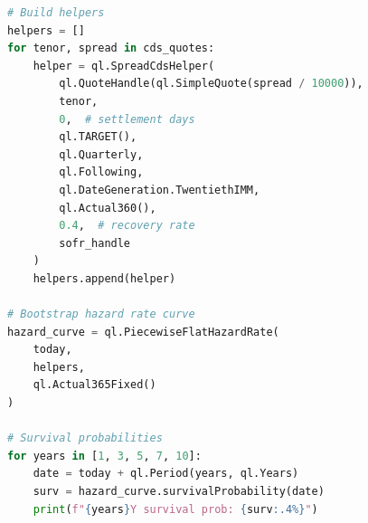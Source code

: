 \documentclass[11pt,a4paper]{article}
\theoremstyle{definition}
\begin{document}
\begin{appendices}
\begin{lstlisting}[language=Python, caption=CDS Curve Bootstrap in QuantLib]
# Build helpers
helpers = []
for tenor, spread in cds_quotes:
    helper = ql.SpreadCdsHelper(
        ql.QuoteHandle(ql.SimpleQuote(spread / 10000)),
        tenor,
        0,  # settlement days
        ql.TARGET(),
        ql.Quarterly,
        ql.Following,
        ql.DateGeneration.TwentiethIMM,
        ql.Actual360(),
        0.4,  # recovery rate
        sofr_handle
    )
    helpers.append(helper)

# Bootstrap hazard rate curve
hazard_curve = ql.PiecewiseFlatHazardRate(
    today,
    helpers,
    ql.Actual365Fixed()
)

# Survival probabilities
for years in [1, 3, 5, 7, 10]:
    date = today + ql.Period(years, ql.Years)
    surv = hazard_curve.survivalProbability(date)
    print(f"{years}Y survival prob: {surv:.4%}")
\end{lstlisting}

\end{appendices}
\end{document}
